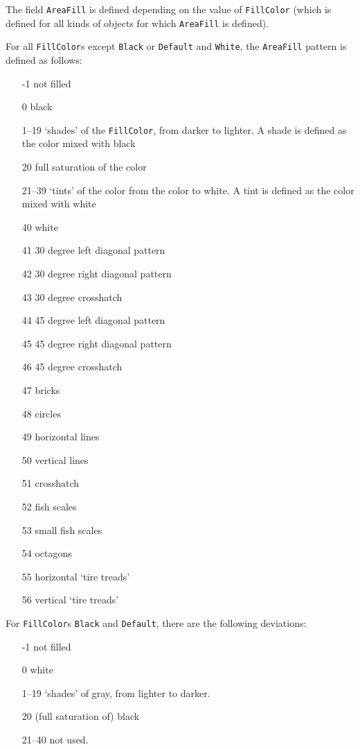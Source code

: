 \documentclass[10pt, a4paper, english]{article}%
\begin{document}
The field \texttt{AreaFill} is defined depending on the value of \texttt{FillColor} 
(which is defined for all kinds of objects 
for which \texttt{AreaFill} is defined). 


For all \texttt{FillColor}s except \texttt{Black} or \texttt{Default} and \texttt{White}, 
the \texttt{AreaFill} pattern is defined as follows: 
%
\begin{enumerate}
\item[-1]    not filled
\item[0]     black
\item[1--19]  `shades' of the \texttt{FillColor}, from darker to lighter.
             A shade is defined as the color mixed with black
\item[20]    full saturation of the color
\item[21--39] `tints' of the color from the color to white.
             A tint is defined as the color mixed with white
\item[40]    white
\item[41]    30 degree left diagonal pattern
\item[42]    30 degree right diagonal pattern
\item[43]    30 degree crosshatch
\item[44]    45 degree left diagonal pattern
\item[45]    45 degree right diagonal pattern
\item[46]    45 degree crosshatch
\item[47]    bricks
\item[48]    circles
\item[49]    horizontal lines
\item[50]    vertical lines
\item[51]    crosshatch
\item[52]    fish scales
\item[53]    small fish scales
\item[54]    octagons
\item[55]    horizontal `tire treads'
\item[56]    vertical `tire treads'
\end{enumerate}

For \texttt{FillColor}s \texttt{Black} and \texttt{Default}, 
there are the following deviations: 
%
\begin{enumerate}
\item[-1]    not filled
\item[0]     white
\item[1--19]  `shades' of gray, from lighter to darker.
\item[20]    (full saturation of) black
\item[21--40] not used. 
\end{enumerate}
\end{document}
